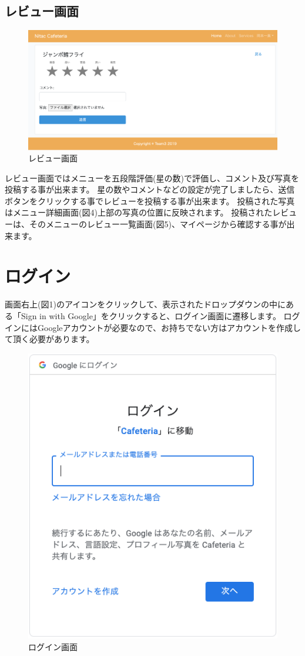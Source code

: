 \documentclass[a4paper]{ltjsarticle}
\begin{document}
\subsection{レビュー画面}
    \begin{figure}[htbp]
    \centering
        \caption{レビュー画面}
        \includegraphics[scale = 0.3]{image/review2.png}
    \end{figure}
    レビュー画面ではメニューを五段階評価(星の数)で評価し、コメント及び写真を投稿する事が出来ます。
    星の数やコメントなどの設定が完了しましたら、送信ボタンをクリックする事でレビューを投稿する事が出来ます。
    投稿された写真はメニュー詳細画面(図4)上部の写真の位置に反映されます。
    投稿されたレビューは、そのメニューのレビュー一覧画面(図5)、マイページから確認する事が出来ます。

\section{ログイン}
    画面右上(図1)のアイコンをクリックして、表示されたドロップダウンの中にある「Sign in with Google」をクリックすると、ログイン画面に遷移します。
    ログインにはGoogleアカウントが必要なので、お持ちでない方はアカウントを作成して頂く必要があります。
    \begin{figure}[htbp]
    \centering
        \caption{ログイン画面}
        \includegraphics[scale = 0.3]{image/login.png}
    \end{figure}
\end{document}
